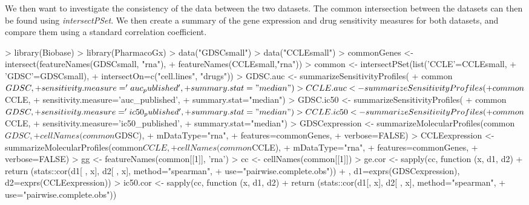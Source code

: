 \documentclass[11pt]{article}
\begin{document}
We then want to investigate the consistency of the data between the two datasets. The common intersection between the datasets can then be found using \textit{intersectPSet}. We then create a summary of the gene expression and drug sensitivity measures for both datasets, and compare them using a standard correlation coefficient. 

\begin{Schunk}
\begin{Sinput}
>   library(Biobase)
>   library(PharmacoGx)
>   data("GDSCsmall")
>   data("CCLEsmall")
>   commonGenes <- intersect(featureNames(GDSCsmall, "rna"),
+                            featureNames(CCLEsmall,"rna"))
>   common <- intersectPSet(list('CCLE'=CCLEsmall,
+                                'GDSC'=GDSCsmall),
+                           intersectOn=c("cell.lines", "drugs"))
>   GDSC.auc <- summarizeSensitivityProfiles(
+                 common$GDSC,
+                 sensitivity.measure='auc_published', 
+                 summary.stat="median")
>   CCLE.auc <- summarizeSensitivityProfiles(
+                 common$CCLE,
+                 sensitivity.measure='auc_published', 
+                 summary.stat="median")
>   GDSC.ic50 <- summarizeSensitivityProfiles(
+                 common$GDSC, 
+                 sensitivity.measure='ic50_published', 
+                 summary.stat="median")
>   CCLE.ic50 <- summarizeSensitivityProfiles(
+                 common$CCLE, 
+                 sensitivity.measure='ic50_published', 
+                 summary.stat="median")
>   GDSCexpression <- summarizeMolecularProfiles(common$GDSC, 
+                                         cellNames(common$GDSC),
+                                         mDataType="rna",
+                                         features=commonGenes,
+                                         verbose=FALSE)
>   CCLEexpression <- summarizeMolecularProfiles(common$CCLE, 
+                                          cellNames(common$CCLE),
+                                          mDataType="rna",
+                                          features=commonGenes,
+                                          verbose=FALSE)
>   gg <- featureNames(common[[1]], 'rna')
>   cc <- cellNames(common[[1]])
>   ge.cor <- sapply(cc, function (x, d1, d2) {
+     return (stats::cor(d1[ , x], d2[ , x], method="spearman",
+                 use="pairwise.complete.obs"))
+   }, d1=exprs(GDSCexpression), d2=exprs(CCLEexpression))
>   ic50.cor <- sapply(cc, function (x, d1, d2) {
+     return (stats::cor(d1[, x], d2[ , x], method="spearman",
+                 use="pairwise.complete.obs"))
}
\end{Sinput}
\end{Schunk}
\end{document}
